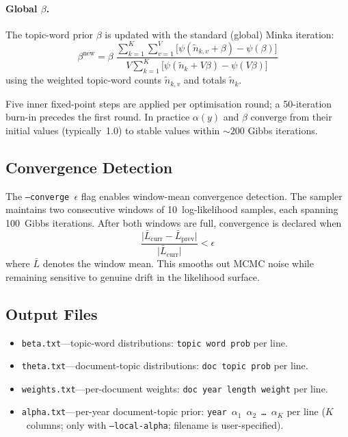 \documentclass[11pt]{article}
\begin{document}
\paragraph{Global $\beta$.}
The topic-word prior $\beta$ is updated with the standard (global) Minka iteration:
\[
\beta^{\text{new}}
  = \beta \;\frac{\displaystyle\sum_{k=1}^{K}\sum_{v=1}^{V}
      \bigl[\psi(\tilde n_{k,v}+\beta)-\psi(\beta)\bigr]}
     {\displaystyle V\sum_{k=1}^{K}
      \bigl[\psi(\tilde n_{k}+V\beta)-\psi(V\beta)\bigr]}
\]
using the weighted topic-word counts $\tilde n_{k,v}$ and totals $\tilde n_k$.

Five inner fixed-point steps are applied per optimisation round; a 50-iteration burn-in precedes the first round.
In practice $\alpha(y)$ and $\beta$ converge from their initial values (typically~1.0) to stable values within ${\sim}200$ Gibbs iterations.

\subsection{Convergence Detection}

The \texttt{--converge $\epsilon$} flag enables window-mean convergence detection.
The sampler maintains two consecutive windows of 10~log-likelihood samples, each spanning 100~Gibbs iterations.
After both windows are full, convergence is declared when
\[
\frac{\lvert\bar L_{\text{curr}} - \bar L_{\text{prev}}\rvert}{\lvert\bar L_{\text{curr}}\rvert}
  < \epsilon
\]
where $\bar L$ denotes the window mean.
This smooths out MCMC noise while remaining sensitive to genuine drift in the likelihood surface.

\subsection{Output Files}

\begin{itemize}
\item \texttt{beta.txt}\;---\;topic-word distributions: \texttt{topic word prob} per line.
\item \texttt{theta.txt}\;---\;document-topic distributions: \texttt{doc topic prob} per line.
\item \texttt{weights.txt}\;---\;per-document weights: \texttt{doc year length weight} per line.
\item \texttt{alpha.txt}\;---\;per-year document-topic prior: \texttt{year $\alpha_1$ $\alpha_2$ \ldots\ $\alpha_K$} per line
  ($K$~columns; only with \texttt{--local-alpha}; filename is user-specified).
\end{itemize}
\end{document}

